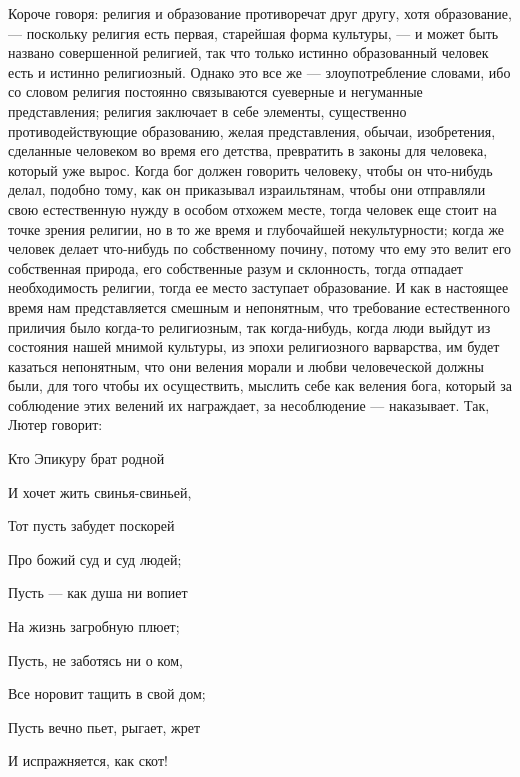 \documentclass[12pt]{article}
\begin{document}
Короче говоря: религия и образование противоречат друг другу, хотя образование, --- поскольку религия есть первая, старейшая форма культуры, --- и может быть названо совершенной религией, так что только истинно образованный человек есть и истинно религиозный. Однако это все же --- злоупотребление словами, ибо со словом религия постоянно связываются суеверные и негуманные представления; религия заключает в себе элементы, существенно противодействующие образованию, желая представления, обычаи, изобретения, сделанные человеком во время его детства, превратить в законы для человека, который уже вырос. Когда бог должен говорить человеку, чтобы он что-нибудь делал, подобно тому, как он приказывал израильтянам, чтобы они отправляли свою естественную нужду в особом отхожем месте, тогда человек еще стоит на точке зрения религии, но в то же время и глубочайшей некультурности; когда же человек делает что-нибудь по собственному почину, потому что ему это велит его собственная природа, его собственные разум и склонность, тогда отпадает необходимость религии, тогда ее место заступает образование. И как в настоящее время нам представляется смешным и непонятным, что требование естественного приличия было когда-то религиозным, так когда-нибудь, когда люди выйдут из состояния нашей мнимой культуры, из эпохи религиозного варварства, им будет казаться непонятным, что они веления морали и любви человеческой должны были, для того чтобы их осуществить, мыслить себе как веления бога, который за соблюдение этих велений их награждает, за несоблюдение --- наказывает. Так, Лютер говорит: 

Кто Эпикуру брат родной 

И хочет жить свинья-свиньей, 

Тот пусть забудет поскорей 

Про божий суд и суд людей; 

Пусть --- как душа ни вопиет 

На жизнь загробную плюет; 

Пусть, не заботясь ни о ком, 

Все норовит тащить в свой дом; 

Пусть вечно пьет, рыгает, жрет 

И испражняется, как скот! 
\end{document}
